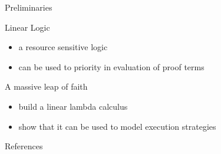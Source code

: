 \documentclass[10pt]{beamer}
\begin{document}
\begin{frame}[fragile]{Preliminaries}
  \begin{alertblock}{Linear Logic}
    \begin{itemize}
      \item a resource sensitive logic
      \item can be used to priority in evaluation of proof terms
    \end{itemize}
  \end{alertblock}

  \pause

  \begin{alertblock}{A massive leap of faith}
    \begin{itemize}
      \item build a linear lambda calculus \cite[]{Maraist1995Jan}
      \item show that it can be used to model execution strategies
    \end{itemize}
  \end{alertblock}
\end{frame}







\begin{frame}[allowframebreaks]{References}
  
  
\end{frame}
\end{document}
